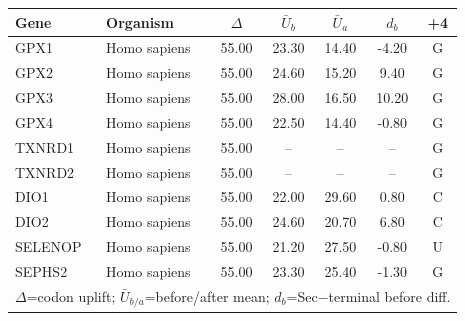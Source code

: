 \begin{center}\footnotesize
\begin{tabular}{llccccc}\toprule
Gene & Organism & $\Delta$ & $\bar{U}_b$ & $\bar{U}_a$ & $d_b$ & +4 \\\midrule
GPX1 & Homo sapiens & 55.00 & 23.30 & 14.40 & -4.20 & G \\
GPX2 & Homo sapiens & 55.00 & 24.60 & 15.20 & 9.40 & G \\
GPX3 & Homo sapiens & 55.00 & 28.00 & 16.50 & 10.20 & G \\
GPX4 & Homo sapiens & 55.00 & 22.50 & 14.40 & -0.80 & G \\
TXNRD1 & Homo sapiens & 55.00 & -- & -- & -- & G \\
TXNRD2 & Homo sapiens & 55.00 & -- & -- & -- & G \\
DIO1 & Homo sapiens & 55.00 & 22.00 & 29.60 & 0.80 & C \\
DIO2 & Homo sapiens & 55.00 & 24.60 & 20.70 & 6.80 & C \\
SELENOP & Homo sapiens & 55.00 & 21.20 & 27.50 & -0.80 & U \\
SEPHS2 & Homo sapiens & 55.00 & 23.30 & 25.40 & -1.30 & G \\
\bottomrule
\multicolumn{7}{l}{\footnotesize $\Delta$=codon uplift; $\bar{U}_{b/a}$=before/after mean; $d_b$=Sec$-$terminal before diff.} \\
\end{tabular}
\end{center}
